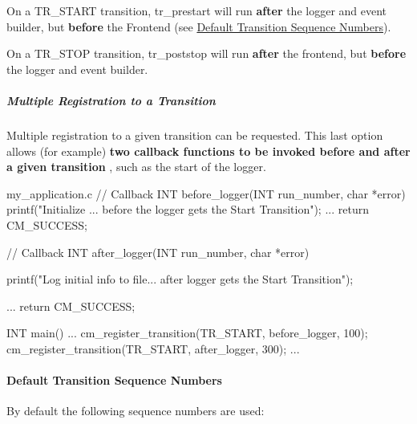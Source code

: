 \begin{DoxyItemize}
\item On a TR\_\-START transition, tr\_\-prestart will run {\bfseries after} the logger and event builder, but {\bfseries before} the Frontend (see \hyperlink{RC_Run_States_and_Transitions_RC_Default_Seq_Numbers}{Default Transition Sequence Numbers}). 
\item On a TR\_\-STOP transition, tr\_\-poststop will run {\bfseries after} the frontend, but {\bfseries before} the logger and event builder. 
\end{DoxyItemize}

\par


\par
 \hypertarget{RC_Run_States_and_Transitions_RC_Multiple_Registration}{}\subparagraph{Multiple Registration to a Transition}\label{RC_Run_States_and_Transitions_RC_Multiple_Registration}
Multiple registration to a given transition can be requested. This last option allows (for example) {\bfseries  two callback functions to be invoked before and after a given transition }, such as the start of the logger.


\begin{DoxyCode}
my_application.c
  // Callback 
  INT before_logger(INT run_number, char *error)
  {
    printf("Initialize ... before the logger gets the Start Transition");
    ...
    return CM_SUCCESS;
  }

  // Callback 
  INT after_logger(INT run_number, char *error)



  {
    printf("Log initial info to file... after logger gets the Start Transition");
      
    ...
    return CM_SUCCESS;
  }

  INT main()
  {
    ...
    cm_register_transition(TR_START, before_logger, 100);
    cm_register_transition(TR_START, after_logger, 300);
    ...
  }
\end{DoxyCode}


\par


\par
 \label{RC_Run_States_and_Transitions_idx_run_transition_sequence}
\hypertarget{RC_Run_States_and_Transitions_idx_run_transition_sequence}{}
 \hypertarget{RC_Run_States_and_Transitions_RC_Default_Seq_Numbers}{}\paragraph{Default Transition Sequence Numbers}\label{RC_Run_States_and_Transitions_RC_Default_Seq_Numbers}
By default the following sequence numbers are used:

